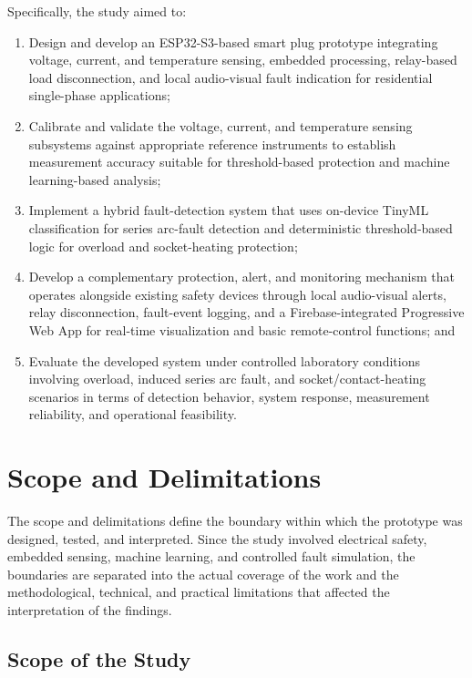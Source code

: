 Specifically, the study aimed to:

\begin{enumerate}
\def\labelenumi{\arabic{enumi}.}
\item
  Design and develop an ESP32-S3-based smart plug prototype integrating
  voltage, current, and temperature sensing, embedded processing,
  relay-based load disconnection, and local audio-visual fault
  indication for residential single-phase applications;
\item
  Calibrate and validate the voltage, current, and temperature sensing
  subsystems against appropriate reference instruments to establish
  measurement accuracy suitable for threshold-based protection and
  machine learning-based analysis;
\item
  Implement a hybrid fault-detection system that uses on-device TinyML
  classification for series arc-fault detection and deterministic
  threshold-based logic for overload and socket-heating protection;
\item
  Develop a complementary protection, alert, and monitoring mechanism
  that operates alongside existing safety devices through local
  audio-visual alerts, relay disconnection, fault-event logging, and a
  Firebase-integrated Progressive Web App for real-time visualization
  and basic remote-control functions; and
\item
  Evaluate the developed system under controlled laboratory conditions
  involving overload, induced series arc fault, and
  socket/contact-heating scenarios in terms of detection behavior,
  system response, measurement reliability, and operational feasibility.
\end{enumerate}

\section{Scope and Delimitations}\label{scope-and-delimitations}

The scope and delimitations define the boundary within which the
prototype was designed, tested, and interpreted. Since the study
involved electrical safety, embedded sensing, machine learning, and
controlled fault simulation, the boundaries are separated into the
actual coverage of the work and the methodological, technical, and
practical limitations that affected the interpretation of the findings.

\subsection{Scope of the Study}\label{scope-of-the-study}

